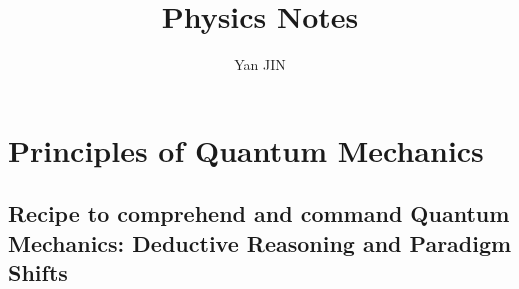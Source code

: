 \documentclass[12pt]{article}
\numberwithin{equation}{section}
\begin{document}
\small
\title{Physics Notes}
\author{Yan JIN}
\pagestyle{fancy}\fancyhf{}
\lhead{}
\lfoot{\textit{}}\cfoot{}\rfoot{\thepage}
\renewcommand{\headrulewidth}{1.pt}
\renewcommand{\footrulewidth}{1.pt}
\maketitle
\tableofcontents
\section{Principles of Quantum Mechanics}
\subsection{Recipe to comprehend and command Quantum Mechanics: Deductive Reasoning and  Paradigm Shifts}
\end{document}
